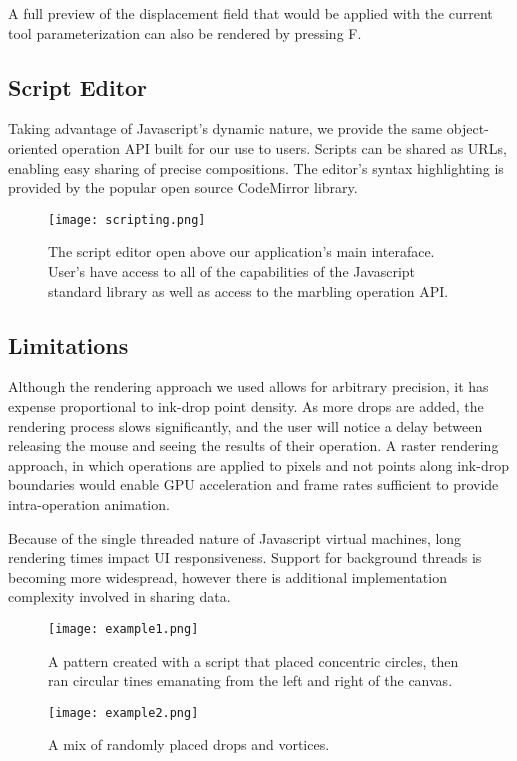 \documentclass{article}
\begin{document}
A full preview of the displacement field that would be applied with the current tool parameterization can also be rendered by pressing F.

\subsection{Script Editor}

Taking advantage of Javascript's dynamic nature, we provide the same object-oriented operation API built for our use to users. Scripts can be shared as URLs, enabling easy sharing of precise compositions. The editor's syntax highlighting is provided by the popular open source CodeMirror library.

\begin{figure}
    \texttt{[image: scripting.png]}
    \caption{The script editor open above our application's main interaface. User's have access to all of the capabilities of the Javascript standard library as well as access to the marbling operation API.}
\end{figure}

\subsection{Limitations}

Although the rendering approach we used allows for arbitrary precision, it has expense proportional to ink-drop point density. As more drops are added, the rendering process slows significantly, and the user will notice a delay between releasing the mouse and seeing the results of their operation. A raster rendering approach, in which operations are applied to pixels and not points along ink-drop boundaries would enable GPU acceleration and frame rates sufficient to provide intra-operation animation.

Because of the single threaded nature of Javascript virtual machines, long rendering times impact UI responsiveness. Support for background threads is becoming more widespread, however there is additional implementation complexity involved in sharing data.

\begin{figure}
    \texttt{[image: example1.png]}
    \caption{A pattern created with a script that placed concentric circles, then ran circular tines emanating from the left and right of the canvas.}
\end{figure}

\begin{figure}
    \texttt{[image: example2.png]}
    \caption{A mix of randomly placed drops and vortices.}
\end{figure}
\end{document}

